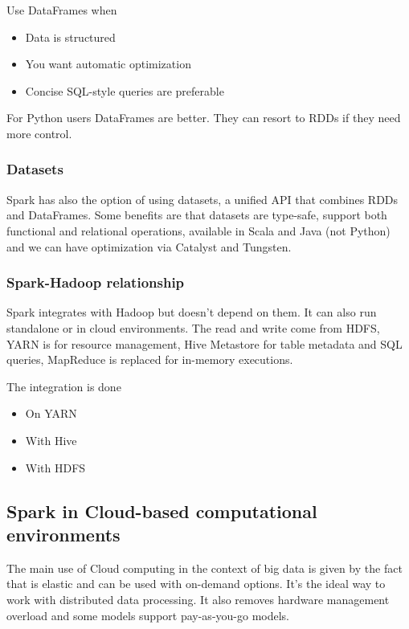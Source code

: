 Use DataFrames when

\begin{itemize}
    \item Data is structured
    \item You want automatic optimization
    \item Concise SQL-style queries are preferable
\end{itemize}

For Python users DataFrames are better. They can resort to RDDs if they need more control.




\subsubsection{Datasets}

Spark has also the option of using datasets, a unified API that combines RDDs and DataFrames. Some benefits are that datasets are type-safe, support both functional and relational operations, available in Scala and Java (not Python) and we can have optimization via Catalyst and Tungsten.

\subsubsection{Spark-Hadoop relationship}


Spark integrates with Hadoop but doesn't depend on them. It can also run standalone or in cloud environments. The read and write come from HDFS, YARN is for resource management, Hive Metastore for table metadata and SQL queries, MapReduce is replaced for in-memory executions.

\vspace{10pt}

The integration is done
\begin{itemize}
    \item On YARN
    \item With Hive
    \item With HDFS
\end{itemize}


\subsection{Spark in Cloud-based computational environments}

The main use of Cloud computing in the context of big data is given by the fact that is elastic and can be used with on-demand options. It's the ideal way to work with distributed data processing. It also removes hardware management overload and some models support pay-as-you-go models. 

